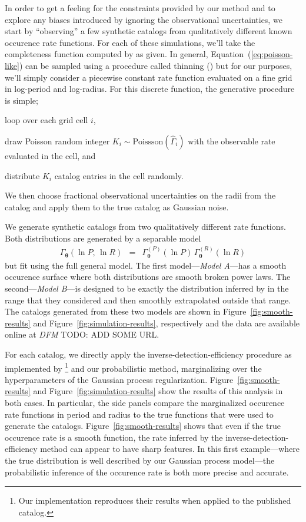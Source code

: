 \documentclass[12pt,preprint]{aastex}
\newcommand{\Fig}[1]{Figure~\ref{fig:#1}}
\newcommand{\fig}[1]{\Fig{#1}}
\newcommand{\Eq}[1]{Equation~(\ref{eq:#1})}
\newcommand{\eq}[1]{\Eq{#1}}
\newcommand{\bvec}[1]{\ensuremath{\boldsymbol{#1}}}
\newcommand{\todo}[3]{{\color{#2} \emph{#1} TODO: #3}}
\newcommand{\dfmtodo}[1]{\todo{DFM}{red}{#1}}
\newcommand{\rate}{\ensuremath{\Gamma}}
\newcommand{\ratepar}{{\ensuremath{\theta}}}
\newcommand{\ratepars}{{\ensuremath{\bvec{\ratepar}}}}
\newcommand{\obs}[1]{\ensuremath{\hat{#1}}}
\newcommand{\radius}{\ensuremath{R}}
\newcommand{\period}{\ensuremath{P}}
\newcommand{\modela}{\emph{Model A}}
\newcommand{\modelb}{\emph{Model B}}
\begin{document}
In order to get a feeling for the constraints provided by our method and to
explore any biases introduced by ignoring the observational uncertainties, we
start by ``observing'' a few synthetic catalogs from qualitatively different
known occurence rate functions.
For each of these simulations, we'll take the completeness function computed
by \citet{petigura} as given.
In general, \eq{poisson-like} can be sampled using a procedure called thinning
(\citealt{poisson}) but for our purposes, we'll simply consider a piecewise
constant rate function evaluated on a fine grid in log-period and log-radius.
For this discrete function, the generative procedure is simple;
\begin{enumerate}
{\item loop over each grid cell $i$,}
{\item draw Poisson random integer $K_i\sim\mathrm{Poissson}(\obs{\rate}_i)$
with the observable rate evaluated in the cell, and}
{\item distribute $K_i$ catalog entries in the cell randomly.}
\end{enumerate}
We then choose fractional observational uncertainties on the radii from the
\citet{petigura} catalog and apply them to the true catalog as Gaussian noise.

We generate synthetic catalogs from two qualitatively different rate
functions.
Both distributions are generated by a separable model
\begin{eqnarray}
\rate_\ratepars (\ln\period,\,\ln\radius) &=&
    \rate_\ratepars^{(\period)}(\ln\period)\,
    \rate_\ratepars^{(\radius)}(\ln\radius)
\end{eqnarray}
but fit using the full general model.
The first model---\modela---has a smooth occurence surface where both
distributions are smooth broken power laws.
The second---\modelb---is designed to be exactly the distribution inferred by
\citet{petigura} in the range that they considered and then smoothly
extrapolated outside that range.
The catalogs generated from these two models are shown in \fig{smooth-results}
and \fig{simulation-results}, respectively and the data are available online
at \dfmtodo{ADD SOME URL}.

For each catalog, we directly apply the inverse-detection-efficiency procedure
as implemented by \citealt{petigura}\footnote{Our implementation reproduces
their results when applied to the published catalog.} and our probabilistic
method, marginalizing over the hyperparameters of the Gaussian process
regularization.
\Fig{smooth-results} and \fig{simulation-results} show the results of this
analysis in both cases.
In particular, the side panels compare the marginalized occurence rate
functions in period and radius to the true functions that were used to
generate the catalogs.
\Fig{smooth-results} shows that even if the true occurence rate is a smooth
function, the rate inferred by the inverse-detection-efficiency method can
appear to have sharp features.
In this first example---where the true distribution is well described by our
Gaussian process model---the probabilistic inference of the occurence rate is
both more precise and accurate.
\end{document}
